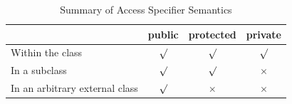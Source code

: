 \documentclass{overturerepchap}
\newcommand{\keyw}[1]{{\bf\ttfamily #1}}
\begin{document}
\begin{table}
\begin{center}
\begin{tabular}{|l|c|c|c|}\hline
                 & \keyw{public} & \keyw{protected} & \keyw{private}\\ \hline
Within the class & $\surd$       & $\surd$          & $\surd$ \\
In a subclass    & $\surd$       & $\surd$          & $\times$\\
In an arbitrary 
external class   & $\surd$       & $\times$         & $\times$ \\
\hline
\end{tabular}
\end{center}
\caption{Summary of Access Specifier Semantics}\label{table:access}
\end{table}
\end{document}
